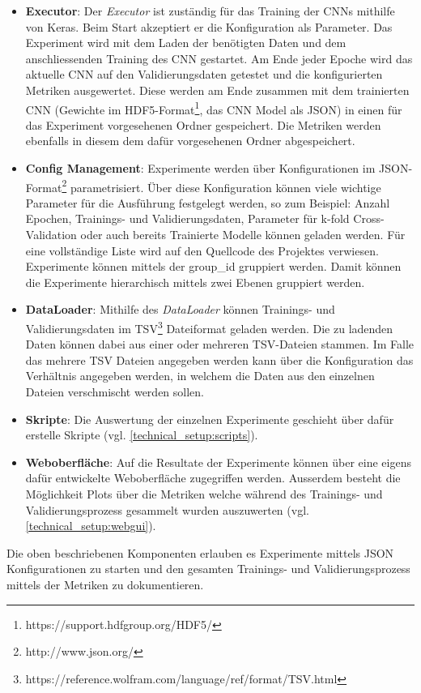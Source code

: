 \begin{itemize}
	\item \textbf{Executor}: Der \emph{Executor} ist zuständig für das Training der CNNs mithilfe von Keras. Beim Start akzeptiert er die Konfiguration als Parameter. Das Experiment wird mit dem Laden der benötigten Daten und dem anschliessenden Training des CNN gestartet. Am Ende jeder Epoche wird das aktuelle CNN auf den Validierungsdaten getestet und die konfigurierten Metriken ausgewertet. Diese werden am Ende zusammen mit dem trainierten CNN (Gewichte im HDF5-Format\footnote{https://support.hdfgroup.org/HDF5/}, das CNN Model als JSON) in einen für das Experiment vorgesehenen Ordner gespeichert. Die Metriken werden ebenfalls in diesem dem dafür vorgesehenen Ordner abgespeichert.
	\item \textbf{Config Management}: Experimente werden über Konfigurationen im JSON-Format\footnote{http://www.json.org/} parametrisiert. Über diese Konfiguration können viele wichtige Parameter für die Ausführung festgelegt werden, so zum Beispiel: Anzahl Epochen, Trainings- und Validierungsdaten, Parameter für k-fold Cross-Validation oder auch bereits Trainierte Modelle können geladen werden. Für eine vollständige Liste wird auf den Quellcode des Projektes verwiesen. Experimente können mittels der group{\_}id gruppiert werden. Damit können die Experimente hierarchisch mittels zwei Ebenen gruppiert werden.
	\item \textbf{DataLoader}: Mithilfe des \emph{DataLoader} können Trainings- und Validierungsdaten im TSV\footnote{https://reference.wolfram.com/language/ref/format/TSV.html} Dateiformat geladen werden. Die zu ladenden Daten können dabei aus einer oder mehreren TSV-Dateien stammen. Im Falle das mehrere TSV Dateien angegeben werden kann über die Konfiguration das Verhältnis angegeben werden, in welchem die Daten aus den einzelnen Dateien verschmischt werden sollen.
	\item \textbf{Skripte}: Die Auswertung der einzelnen Experimente geschieht über dafür erstelle Skripte (vgl. \ref{technical_setup:scripts}).
	\item \textbf{Weboberfläche}: Auf die Resultate der Experimente können über eine eigens dafür entwickelte Weboberfläche zugegriffen werden. Ausserdem besteht die Möglichkeit Plots über die Metriken welche während des Trainings- und Validierungsprozess gesammelt wurden auszuwerten (vgl. \ref{technical_setup:webgui}).
\end{itemize}
Die oben beschriebenen Komponenten erlauben es Experimente mittels JSON Konfigurationen zu starten und den gesamten Trainings- und Validierungsprozess mittels der Metriken zu dokumentieren.

